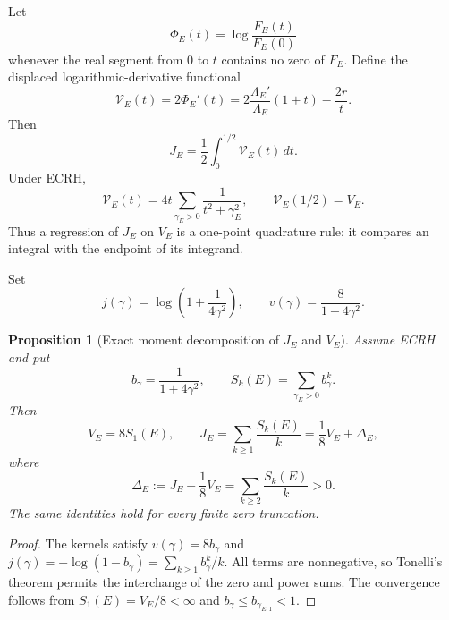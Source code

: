 \documentclass[11pt,reqno]{amsart}
\newtheorem{proposition}{Proposition}
\theoremstyle{remark}
\begin{document}
Let
\begin{equation}
  \Phi_E(t)=\log\frac{F_E(t)}{F_E(0)}
\end{equation}
whenever the real segment from $0$ to $t$ contains no zero of $F_E$.  Define the displaced logarithmic-derivative functional
\begin{equation}
  \mathscr V_E(t)
  =2\Phi_E'(t)
  =2\frac{\Lambda_E'}{\Lambda_E}(1+t)-\frac{2r}{t}.
  \label{eq:displaced-V}
\end{equation}
Then
\begin{equation}
  \boxed{
  J_E=\frac12\int_0^{1/2}\mathscr V_E(t)\,dt.
  }
  \label{eq:integral-identity}
\end{equation}
Under ECRH,
\begin{equation}
  \mathscr V_E(t)
  =4t\sum_{\gamma_E>0}\frac{1}{t^2+\gamma_E^2},
  \qquad
  \mathscr V_E(1/2)=V_E.
  \label{eq:Vt-ECRH}
\end{equation}
Thus a regression of $J_E$ on $V_E$ is a one-point quadrature rule: it compares an integral with the endpoint of its integrand.

Set
\begin{equation}
  j(\gamma)=\log\!\left(1+\frac{1}{4\gamma^2}\right),
  \qquad
  v(\gamma)=\frac{8}{1+4\gamma^2}.
  \label{eq:kernels}
\end{equation}


\begin{proposition}[Exact moment decomposition of $J_E$ and $V_E$]
\label{prop:Delta-decomposition}
Assume ECRH and put
\begin{equation}
  b_\gamma=\frac{1}{1+4\gamma^2},
  \qquad
  S_k(E)=\sum_{\gamma_E>0}b_\gamma^k.
\end{equation}
Then
\begin{equation}
  \boxed{
  V_E=8S_1(E),\qquad
  J_E=\sum_{k\ge1}\frac{S_k(E)}{k}
  =\frac18V_E+\Delta_E,
  }
  \label{eq:Delta-decomposition}
\end{equation}
where
\begin{equation}
  \boxed{
  \Delta_E:=J_E-\frac18V_E
  =\sum_{k\ge2}\frac{S_k(E)}{k}>0.
  }
  \label{eq:Delta-statistic}
\end{equation}
The same identities hold for every finite zero truncation.
\end{proposition}

\begin{proof}
The kernels satisfy $v(\gamma)=8b_\gamma$ and
$j(\gamma)=-\log(1-b_\gamma)=\sum_{k\ge1}b_\gamma^k/k$.  All terms are nonnegative, so Tonelli's theorem permits the interchange of the zero and power sums.  The convergence follows from $S_1(E)=V_E/8<\infty$ and $b_\gamma\le b_{\gamma_{E,1}}<1$.
\end{proof}
\end{document}
